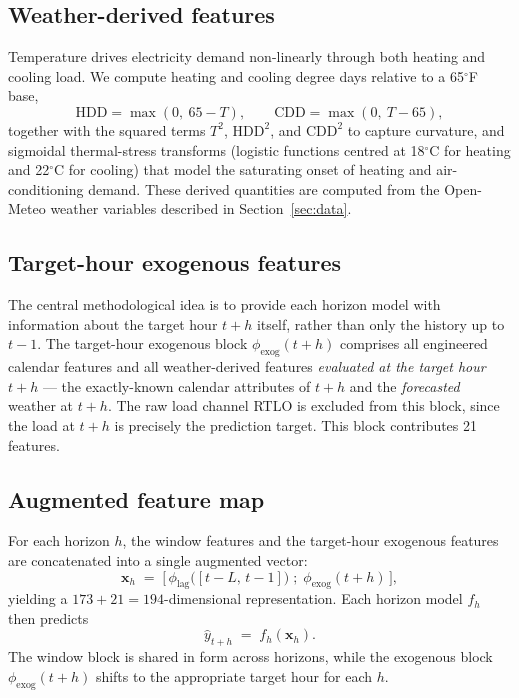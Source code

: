 \subsection{Weather-derived features}

Temperature drives electricity demand non-linearly through both heating and
cooling load. We compute heating and cooling degree days relative to a 65$^{\circ}$F
base,
\begin{equation}
\mathrm{HDD} = \max(0,\ 65 - T), \qquad
\mathrm{CDD} = \max(0,\ T - 65),
\end{equation}
together with the squared terms $T^2$, $\mathrm{HDD}^2$, and $\mathrm{CDD}^2$ to
capture curvature, and sigmoidal thermal-stress transforms (logistic functions
centred at 18$^{\circ}$C for heating and 22$^{\circ}$C for cooling) that model the
saturating onset of heating and air-conditioning demand. These derived quantities
are computed from the Open-Meteo weather variables described in
Section~\ref{sec:data}.

\subsection{Target-hour exogenous features}

The central methodological idea is to provide each horizon model with information
about the target hour $t+h$ itself, rather than only the history up to $t-1$. The
target-hour exogenous block $\phi_{\mathrm{exog}}(t+h)$ comprises all engineered
calendar features and all weather-derived features \emph{evaluated at the target
hour} $t+h$ --- the exactly-known calendar attributes of $t+h$ and the
\emph{forecasted} weather at $t+h$. The raw load channel RTLO is excluded from
this block, since the load at $t+h$ is precisely the prediction target. This block
contributes 21 features.

\subsection{Augmented feature map}

For each horizon $h$, the window features and the target-hour exogenous features
are concatenated into a single augmented vector:
\begin{equation}
\mathbf{x}_h \;=\; \bigl[\, \phi_{\mathrm{lag}}\!\bigl([t-L,\, t-1]\bigr)
\;;\; \phi_{\mathrm{exog}}(t+h) \,\bigr],
\label{eq:augmented}
\end{equation}
yielding a $173 + 21 = 194$-dimensional representation. Each horizon model
$f_h$ then predicts
\begin{equation}
\hat{y}_{t+h} \;=\; f_h(\mathbf{x}_h).
\end{equation}
The window block is shared in form across horizons, while the exogenous block
$\phi_{\mathrm{exog}}(t+h)$ shifts to the appropriate target hour for each $h$.


